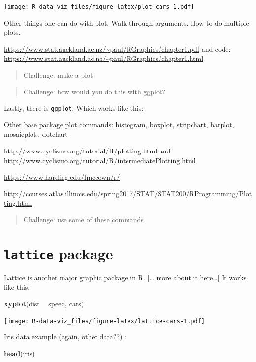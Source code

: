 \documentclass[]{book}
\newenvironment{Shaded}{\begin{snugshade}}{\end{snugshade}}
\newcommand{\KeywordTok}[1]{\textcolor[rgb]{0.13,0.29,0.53}{\textbf{#1}}}
\newcommand{\StringTok}[1]{\textcolor[rgb]{0.31,0.60,0.02}{#1}}
\newcommand{\OperatorTok}[1]{\textcolor[rgb]{0.81,0.36,0.00}{\textbf{#1}}}
\newcommand{\NormalTok}[1]{#1}
\theoremstyle{definition}
\theoremstyle{definition}
\theoremstyle{definition}
\theoremstyle{remark}
\begin{document}
\texttt{[image: R-data-viz\_files/figure-latex/plot-cars-1.pdf]}

Other things one can do with plot. Walk through arguments. How to do
multiple plots.

\url{https://www.stat.auckland.ac.nz/~paul/RGraphics/chapter1.pdf} and
code:
\url{https://www.stat.auckland.ac.nz/~paul/RGraphics/chapter1.html}

\begin{quote}
Challenge: make a plot
\end{quote}

\begin{quote}
Challenge: how would you do this with ggplot?
\end{quote}

Lastly, there is \texttt{ggplot}. Which works like this:

Other base package plot commands: histogram, boxplot, stripchart,
barplot, mosaicplot.. dotchart

\url{http://www.cyclismo.org/tutorial/R/plotting.html} and
\url{http://www.cyclismo.org/tutorial/R/intermediatePlotting.html}

\url{https://www.harding.edu/fmccown/r/}

\url{http://courses.atlas.illinois.edu/spring2017/STAT/STAT200/RProgramming/Plotting.html}

\begin{quote}
Challenge: use some of these commands
\end{quote}

\section{\texorpdfstring{\texttt{lattice}
package}{lattice package}}\label{lattice-package}

Lattice is another major graphic package in R. {[}\ldots{} more about it
here\ldots{}{]} It works like this:

\begin{Shaded}
\begin{Highlighting}[]
\KeywordTok{xyplot}\NormalTok{(dist }\OperatorTok{~}\StringTok{ }\NormalTok{speed, cars)}
\end{Highlighting}
\end{Shaded}

\texttt{[image: R-data-viz\_files/figure-latex/lattice-cars-1.pdf]}

Iris data example (again, other data??) :

\begin{Shaded}
\begin{Highlighting}[]
\KeywordTok{head}\NormalTok{(iris)}
\end{Highlighting}
\end{Shaded}
\end{document}

